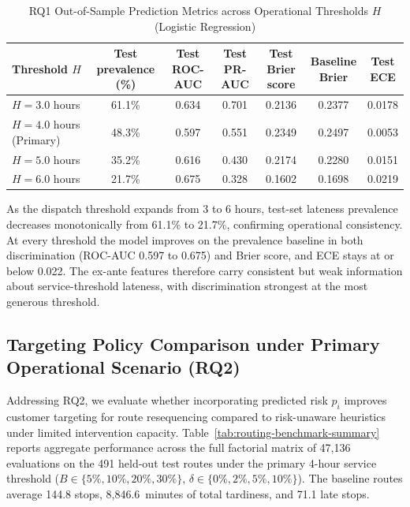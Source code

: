 \documentclass[11pt,a4paper]{article}
\begin{document}
\begin{table}[htbp]
\centering
\caption{RQ1 Out-of-Sample Prediction Metrics across Operational Thresholds $H$ (Logistic Regression)}
\label{tab:rq1-sensitivity}
\scriptsize
\setlength{\tabcolsep}{3pt}
\renewcommand{\arraystretch}{1.15}
\begin{tabular}{lcccccc}
\toprule
\textbf{Threshold $H$} & \shortstack{\textbf{Test}\\\textbf{prevalence (\%)}} & \shortstack{\textbf{Test}\\\textbf{ROC-AUC}} & \shortstack{\textbf{Test}\\\textbf{PR-AUC}} & \shortstack{\textbf{Test Brier}\\\textbf{score}} & \shortstack{\textbf{Baseline}\\\textbf{Brier}} & \shortstack{\textbf{Test}\\\textbf{ECE}} \\
\midrule
$H = 3.0$ hours & 61.1\% & 0.634 & 0.701 & 0.2136 & 0.2377 & 0.0178 \\
$H = 4.0$ hours (Primary) & 48.3\% & 0.597 & 0.551 & 0.2349 & 0.2497 & 0.0053 \\
$H = 5.0$ hours & 35.2\% & 0.616 & 0.430 & 0.2174 & 0.2280 & 0.0151 \\
$H = 6.0$ hours & 21.7\% & 0.675 & 0.328 & 0.1602 & 0.1698 & 0.0219 \\
\bottomrule
\end{tabular}
\end{table}

As the dispatch threshold expands from 3 to 6 hours, test-set lateness prevalence decreases monotonically from 61.1\% to 21.7\%, confirming operational consistency. At every threshold the model improves on the prevalence baseline in both discrimination (ROC-AUC 0.597 to 0.675) and Brier score, and ECE stays at or below 0.022. The ex-ante features therefore carry consistent but weak information about service-threshold lateness, with discrimination strongest at the most generous threshold.

\subsection{Targeting Policy Comparison under Primary Operational Scenario (RQ2)}\label{sec:res-rq2}

Addressing RQ2, we evaluate whether incorporating predicted risk $p_i$ improves customer targeting for route resequencing compared to risk-unaware heuristics under limited intervention capacity. Table~\ref{tab:routing-benchmark-summary} reports aggregate performance across the full factorial matrix of 47,136 evaluations on the 491 held-out test routes under the primary 4-hour service threshold ($B \in \{5\%, 10\%, 20\%, 30\%\}$, $\delta \in \{0\%, 2\%, 5\%, 10\%\}$). The baseline routes average 144.8 stops, 8,846.6~minutes of total tardiness, and 71.1 late stops.
\end{document}
